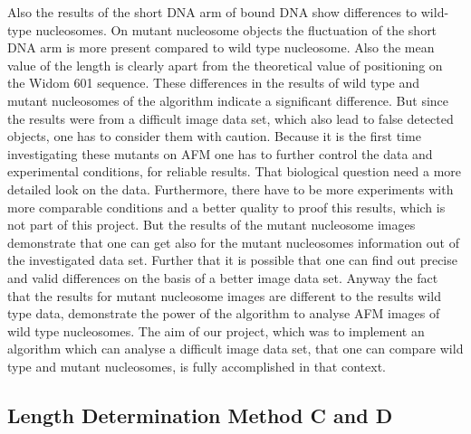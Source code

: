 \documentclass{article}
\begin{document}
Also the results of the short DNA arm of bound DNA show differences to wild-type nucleosomes. On mutant nucleosome objects the fluctuation of the short DNA arm is more present compared to wild type nucleosome. Also the mean value of the length is clearly apart from the theoretical value of positioning on the Widom 601 sequence. These differences in the results of wild type and mutant nucleosomes of the algorithm indicate a significant difference. But since the results were from a difficult image data set, which also lead to false detected objects, one has to consider them with caution. Because it is the first time investigating these mutants on AFM one has to further control the data and experimental conditions, for reliable results. That biological question need a more detailed look on the data. Furthermore, there have to be more experiments with more comparable conditions and a better quality to proof this results, which is not part of this project. But the results of the mutant nucleosome images demonstrate that one can get also for the mutant nucleosomes information out of the investigated data set. Further that it is possible that one can find out precise and valid differences on the basis of a better image data set. Anyway the fact that the results for mutant nucleosome images are different to the results wild type data, demonstrate the power of the algorithm to analyse AFM images of wild type nucleosomes. The aim of our project, which was to implement an algorithm which can analyse a difficult image data set, that one can compare wild type and mutant nucleosomes, is fully accomplished in that context.

\subsection{Length Determination Method C and D}
\end{document}
